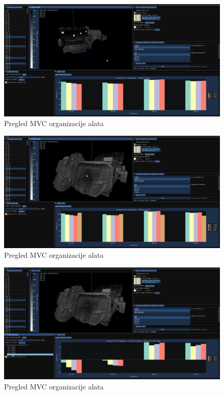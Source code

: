 \documentclass[times, utf8, diplomski]{fer}
\begin{document}
\begin{figure} [H]
	\centering
    \includegraphics[width=\textwidth]{demonstration/selected_cells_max.png}
    \caption{Pregled MVC organizacije alata}
    \label{fig:high-level-overview}
\end{figure}

\begin{figure} [H]
	\centering
    \includegraphics[width=\textwidth]{demonstration/hovered_cell_max.png}
    \caption{Pregled MVC organizacije alata}
    \label{fig:high-level-overview}
\end{figure}

\begin{figure} [H]
	\centering
    \includegraphics[width=\textwidth]{demonstration/selected_cell_relative.png}
    \caption{Pregled MVC organizacije alata}
    \label{fig:high-level-overview}
\end{figure}
\end{document}
